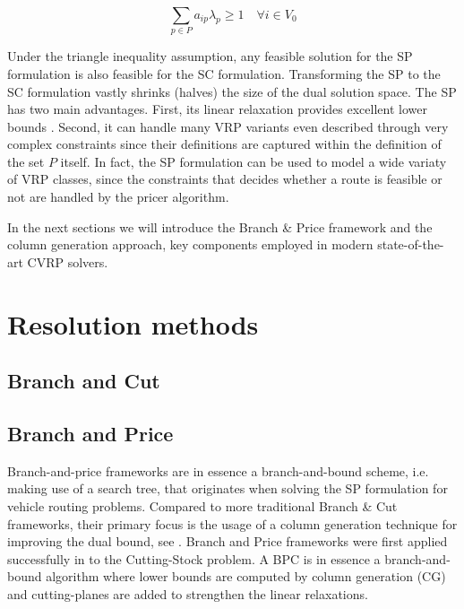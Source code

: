 \begin{equation}\label{eq:set-covering-customers-visited-by-exactly-one-route}
    \sum_{p \in P}  a_{ip} \lambda_p \ge 1  \quad \forall i \in V_0
\end{equation}

Under the triangle inequality assumption, any feasible solution for the SP formulation is also feasible for the SC formulation.
Transforming the SP to the SC formulation vastly shrinks (halves) the size of the dual solution space.
The SP has two main advantages.
First, its linear relaxation provides excellent lower bounds \parencite{bramel1997}.
Second, it can handle many VRP variants even described
through very complex constraints
since their definitions are captured within the definition of the set $P$ itself.
In fact, the SP formulation can be used to model a wide variaty of VRP classes,
since the constraints that decides whether a route is feasible or not are handled
by the pricer algorithm.


In the next sections we will introduce the Branch \& Price framework and the column generation approach, key components employed in modern state-of-the-art CVRP solvers.



\section{Resolution methods}
\label{sec:intro-resolution-methods}

\subsection{Branch and Cut}
\label{sec:intro-branch-and-cut}


\subsection{Branch and Price}
\label{sec:intro-branch-and-price}

Branch-and-price frameworks are in essence a branch-and-bound scheme, i.e. making use of a search tree, that originates when solving the SP formulation for vehicle routing problems.
Compared to more traditional Branch \& Cut frameworks, their primary focus is the usage of a column generation technique for improving the dual bound, see \textcite{righini2008}.
Branch and Price frameworks were first applied successfully in \textcite{gilmore1961} to the Cutting-Stock problem.
A BPC is in essence a branch-and-bound algorithm where lower bounds are computed by column generation (CG) and cutting-planes are added to strengthen the linear relaxations.


